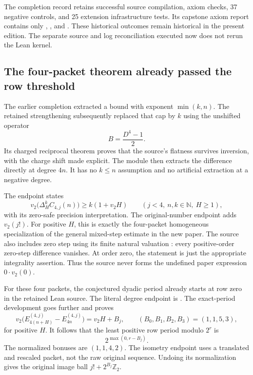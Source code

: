 The completion record retains successful source compilation, axiom checks, 37 negative controls, and 25 extension infrastructure tests. Its capstone axiom report contains only , , and . These historical outcomes remain historical in the present edition. The separate source and log reconciliation executed now does not rerun the Lean kernel.

\subsection{The four-packet theorem already passed the row threshold}
The earlier completion extracted a bound with exponent $\min(k,n)$. The retained strengthening subsequently replaced that cap by $k$ using the unshifted operator
\[
 B=\frac{D^4-1}{2}.
\]
Its charged reciprocal theorem proves that the source's flatness survives inversion, with the charge shift made explicit. The module  then extracts the difference directly at degree $4n$. It has no $k\le n$ assumption and no artificial extraction at a negative degree.

The endpoint  states
\[
 v_2\bigl(\Delta_H^k C_{4,j}(n)\bigr)\ge k(1+v_2H)
 \qquad(j<4,\ n,k\in\mathbb N,\ H\ge1),
\]
with its zero-safe precision interpretation. The original-number endpoint adds $v_2(j!)$. For positive $H$, this is exactly the four-packet homogeneous specialization of the general mixed-step estimate in the new paper. The source also includes zero step using its finite natural valuation : every positive-order zero-step difference vanishes. At order zero, the statement is just the appropriate integrality assertion. Thus the source never forms the undefined paper expression $0\cdot v_2(0)$.

For these four packets, the conjectured dyadic period already starts at row zero in the retained Lean source. The literal degree endpoint is . The exact-period development goes further and proves
\[
 v_2\bigl(E_{4(n+H)}^{(4,j)}-E_{4n}^{(4,j)}\bigr)
   =v_2H+B_j,\qquad (B_0,B_1,B_2,B_3)=(1,1,5,3),
\]
for positive $H$. It follows that the least positive row period modulo $2^r$ is
\[
 2^{\max(0,r-B_j)}.
\]
The normalized bonuses are $(1,1,4,2)$. The isometry endpoint uses a translated and rescaled packet, not the raw original sequence. Undoing its normalization gives the original image ball $j!+2^{B_j}\mathbb Z_2$.

